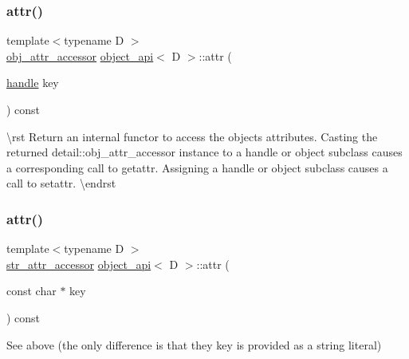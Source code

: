 \subsubsection{\texorpdfstring{attr()}{attr()}\hspace{0.1cm}{\footnotesize\ttfamily [1/2]}}
{\footnotesize\ttfamily template$<$typename D $>$ \\
\mbox{\hyperlink{pytypes_8h_a709d3bd7fb7de203660aadcee497f975}{obj\+\_\+attr\+\_\+accessor}} \mbox{\hyperlink{classobject__api}{object\+\_\+api}}$<$ D $>$\+::attr (\begin{DoxyParamCaption}\item[{\mbox{\hyperlink{classhandle}{handle}}}]{key }\end{DoxyParamCaption}) const}

\textbackslash{}rst Return an internal functor to access the object\textquotesingle{}s attributes. Casting the returned {\ttfamily detail\+::obj\+\_\+attr\+\_\+accessor} instance to a {\ttfamily handle} or {\ttfamily object} subclass causes a corresponding call to {\ttfamily getattr}. Assigning a {\ttfamily handle} or {\ttfamily object} subclass causes a call to {\ttfamily setattr}. \textbackslash{}endrst \mbox{\label{classobject__api_ae5a18d371ec699cd68561d78503b493f}} 
\subsubsection{\texorpdfstring{attr()}{attr()}\hspace{0.1cm}{\footnotesize\ttfamily [2/2]}}
{\footnotesize\ttfamily template$<$typename D $>$ \\
\mbox{\hyperlink{pytypes_8h_a3e386ad6d0167a1022046e78dc281efd}{str\+\_\+attr\+\_\+accessor}} \mbox{\hyperlink{classobject__api}{object\+\_\+api}}$<$ D $>$\+::attr (\begin{DoxyParamCaption}\item[{const char $\ast$}]{key }\end{DoxyParamCaption}) const}



See above (the only difference is that they key is provided as a string literal) 

\mbox{\label{classobject__api_a18ff315942ef1238c6c9d28c0ef9301f}} 
